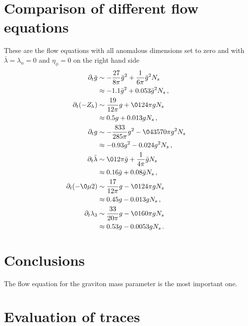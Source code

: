 \documentclass[11pt]{book} %
\begin{document}
{\section{Comparison of different flow equations}

These are the flow equations with all anomalous dimensions set to zero and with $\bar\lambda=\lambda_n=0$ and $\eta_\phi=0$ on the right hand side
\begin{align}
 \partial_t \bar g &\sim -\frac{27}{8 \pi} {\bar g}^2 + \frac1{6\pi}{\bar g}^2 N_s \notag\\
  &\approx -1.1 {\bar g}^2 + 0.053 {\bar g}^2 N_s \,, \label{eq:barg-simple}\\ 
 \partial_t (-Z_h) &\sim  \frac{19}{12 \pi}g + \01{24 \pi} g N_s \notag\\
  &\approx 0.5 g + 0.013 g N_s \,,\label{eq:etah-simple}\\
 \partial_t g &\sim -\frac{833}{285 \pi }g^2 -\0{43}{570 \pi} g^2 N_s\notag\\
  &\approx -0.93 g^2 - 0.024 g^2 N_s \,,\label{eq:g3-simple}\\ 
 \partial_t \bar \lambda &\sim \01{2\pi} \bar g + \frac1{4\pi}{\bar g}N_s \notag\\
  &\approx  0.16 \bar g + 0.08 \bar g N_s \,,\label{eq:barlam-simple}\\ 
 \partial_t (-\0{\mu}2) &\sim \frac{17}{12 \pi }g - \01{24 \pi} g N_s \notag\\
  &\approx 0.45 g - 0.013 g N_s \,,\label{eq:mu-simple}\\
 \partial_t \lambda_3 &\sim \frac{33}{20 \pi }g - \01{60 \pi}g N_s\notag\\
  &\approx 0.53 g - 0.0053 g N_s \,.\label{eq:lam3-simple}
\end{align}



\section{Conclusions}

The flow equation for the graviton mass parameter is the most important one.

\section{Evaluation of traces} \label{app:traces}

}
\end{document}
